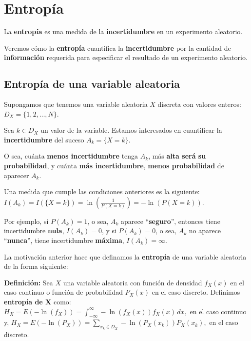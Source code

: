 \documentclass[]{book}
\begin{document}
\hypertarget{entropuxeda}{%
\section{Entropía}\label{entropuxeda}}

La \textbf{entropía} es una medida de la \textbf{incertidumbre} en un experimento aleatorio.

Veremos cómo la \textbf{entropía} cuantifica la \textbf{incertidumbre} por la cantidad de \textbf{información} requerida para especificar el resultado de un experimento aleatorio.

\hypertarget{entropuxeda-de-una-variable-aleatoria}{%
\subsection{Entropía de una variable aleatoria}\label{entropuxeda-de-una-variable-aleatoria}}

Supongamos que tenemos una variable aleatoria \(X\) discreta con valores enteros: \(D_X=\{1,2,\ldots,N\}\).

Sea \(k\in D_X\) un valor de la variable. Estamos interesados en cuantificar la \textbf{incertidumbre} del suceso \(A_k =\{X=k\}\).

O sea, cuánta \textbf{menos incertidumbre} tenga \(A_k\), más \textbf{alta será su probabilidad}, y cuánta \textbf{más incertidumbre}, \textbf{menos probabilidad} de aparecer \(A_k\).

Una medida que cumple las condiciones anteriores es la siguiente: \(I(A_k)=I(\{X=k\})=\ln\left(\frac{1}{P(X=k)}\right)=-\ln\left(P(X=k)\right).\)

Por ejemplo, si \(P(A_k)=1\), o sea, \(A_k\) aparece ``\textbf{seguro}'', entonces tiene incertidumbre \textbf{nula}, \(I(A_k)=0\), y si \(P(A_k)=0\), o sea, \(A_k\) no aparece ``\textbf{nunca}'', tiene incertidumbre \textbf{máxima}, \(I(A_k)=\infty\).

La motivación anterior hace que definamos la \textbf{entropía} de una variable aleatoria de la forma siguiente:

\textbf{Definición:}
Sea \(X\) una variable aleatoria con función de densidad \(f_X(x)\) en el caso continuo o función de probabilidad \(P_X(x)\) en el caso discreto. Definimos \textbf{entropía de X} como:
\(H_X = \displaystyle E\left(-\ln(f_X)\right)=\int_{-\infty}^\infty -\ln(f_X(x)) f_X(x)\, dx,\) en el caso continuo y,
\(H_X = \displaystyle E\left(-\ln(P_X)\right)=\sum_{x_k\in D_X} -\ln(P_X(x_k)) P_X(x_k),\) en el caso discreto.
\end{document}
